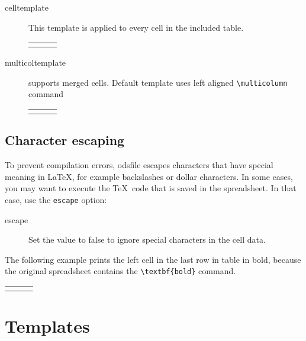 \documentclass{ltxdoc}
\begin{document}
\begin{description}
\item[celltemplate] This template is applied to every cell in the included table.
  \begin{LTXexample}
    \begin{tabular}{lll}
    \end{tabular}
  \end{LTXexample}

\item[multicoltemplate] 
supports merged cells. Default template uses left aligned \verb|\multicolumn|
command
\begin{LTXexample}
  \begin{tabular}{lll}
  \end{tabular}
\end{LTXexample}

\end{description} 

\subsection{Character escaping}

To prevent compilation errors, \textsf{odsfile} escapes characters that have special meaning in \LaTeX, 
for example backslashes or dollar characters. In some cases, you may want to
execute the \TeX\ code that is saved in the spreadsheet. In that case, use the \texttt{escape} option:

\begin{description}

\item[escape] Set the value to false to ignore special characters in the cell data.
\end{description}

The following example prints the left cell in the last row in table in bold, because the original 
spreadsheet contains the \verb|\textbf{bold}| command.

\begin{LTXexample}
\begin{tabular}{lll}
\end{tabular}     
\end{LTXexample}


\section{Templates}\label{sec:tpl}
\end{document}

